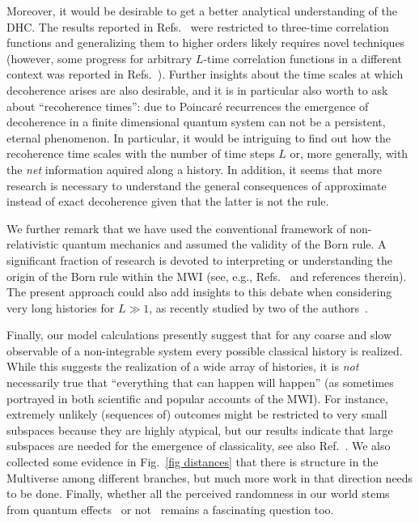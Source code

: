 \documentclass[pre,twocolumn,10pt,aps,longbibliography,nofootinbib]{revtex4-1}
\newcommand{\blue}[1]{#1}
\newcommand{\new}[1]{#1}
\begin{document}
\blue{Moreover,} it would be desirable to get a better analytical understanding of the DHC. The results reported in Refs.~\cite{StrasbergEtAlPRA2023, StrasbergSP2023} were restricted to three-time correlation functions and generalizing them to higher orders likely requires novel techniques (however, some progress for arbitrary $L$-time correlation functions in a different context was reported in Refs.~\cite{FigueroaRomeroModiPollockQuantum2019, FigueroaRomeroPollockModiCP2021, DowlingEtAlQuantum2023, DowlingEtAlSPC2023}). Further insights about the time scales at which \new{decoherence} arises are also desirable, and it is in particular also worth to ask about ``recoherence times'': due to Poincar\'e recurrences the emergence of \new{decoherence} in a finite dimensional quantum system can not be a persistent, eternal phenomenon. In particular, it would be intriguing to find out how the recoherence time scales with the number of time steps $L$ or, more generally, with the \emph{net} information aquired along a history. \blue{In addition, it seems that more research is necessary to understand the general consequences of approximate instead of exact decoherence given that the latter is not the rule.}

We further remark that we have used the conventional framework of non-relativistic quantum mechanics and assumed the validity of the Born rule. A significant fraction of research is devoted to interpreting or understanding the origin of the Born rule within the MWI (see, e.g., Refs.~\cite{VaidmanISPS1998, SaundersEtAlBook2010, AguirreTegmarkPRD2011, WallaceBook2012, Vaidman2020, ZurekEnt2022} \new{and references therein). The present approach could also add insights to this debate when considering very long histories for $L\gg1$, as recently studied by two of the authors~\cite{StrasbergSchindlerArXiv2023}.}

Finally, our model calculations presently suggest that for any coarse and slow observable of a non-integrable system every possible classical history is realized. While this suggests the realization of a wide array of histories, it is \emph{not} necessarily true that ``everything that can happen will happen'' (as sometimes portrayed in both scientific and popular accounts of the MWI). For instance, extremely unlikely (sequences of) outcomes might be restricted to very small subspaces because they are highly atypical, but our results indicate that large subspaces are needed for the emergence of classicality\new{, see also Ref.~\cite{StrasbergSchindlerArXiv2023}}. \blue{We also collected some evidence in Fig.~\ref{fig distances} that there is structure in the Multiverse among different branches, but much more work in that direction needs to be done.} Finally, whether all the perceived randomness in our world stems from quantum effects~\cite{AlbrechtPhillipsPRD2014} \new{or not}~\cite{DelSantoGisinPRA2019} \new{remains a fascinating question too}.
\end{document}
